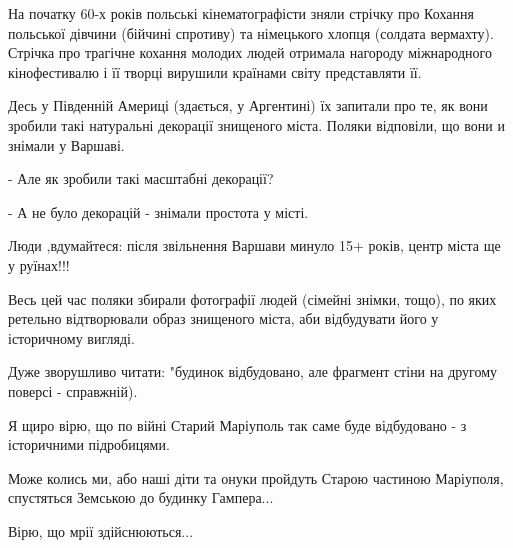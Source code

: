 На початку 60-х років польські кінематографісти зняли стрічку про Кохання
польської дівчини (бійчині спротиву) та німецького хлопця (солдата вермахту).
Стрічка про трагічне кохання молодих людей отримала нагороду міжнародного
кінофестивалю і її творці вирушили країнами світу представляти її.

Десь у Південній Америці (здається, у Аргентині) їх запитали про те, як вони
зробили такі натуральні декорації знищеного міста. Поляки відповіли, що вони и
знімали у Варшаві.

- Але як зробили такі масштабні декорації?

- А не було декорацій - знімали простота у місті.

Люди ,вдумайтеся: після звільнення Варшави минуло 15+ років, центр міста ще у
руїнах!!!

Весь цей час поляки збирали фотографії людей (сімейні знімки, тощо), по яких
ретельно відтворювали образ знищеного міста, аби відбудувати його у історичному
вигляді.

Дуже зворушливо читати: "будинок відбудовано, але фрагмент стіни на другому
поверсі - справжній).

Я щиро вірю, що по війні Старий Маріуполь так саме буде відбудовано - з
історичними підробицями.

Може колись ми, або наші діти та онуки пройдуть Старою частиною Маріуполя,
спустяться Земською до будинку Гампера...

Вірю, що мрії здійснюються...


